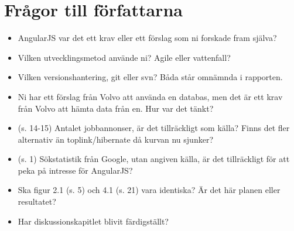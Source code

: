 \section{Frågor till författarna} %
\label{sec:fr_gor_till_f_rfattarna}

\begin{itemize}
    \item AngularJS var det ett krav eller ett förslag som ni forskade fram själva?
    \item Vilken utvecklingsmetod använde ni? Agile eller vattenfall?
    \item Vilken versionshantering, git eller svn? Båda står omnämnda i rapporten.
    \item Ni har ett förslag från Volvo att använda en databas, men det är ett krav från Volvo att hämta data från en. Hur var det tänkt?
    \item (s. 14-15) Antalet jobbannonser, är det tillräckligt som källa? Finns det fler alternativ än toplink/hibernate då kurvan nu sjunker?
    \item (s. 1) Sökstatistik från Google, utan angiven källa, är det tillräckligt för att peka på intresse för AngularJS?
    \item Ska figur 2.1 (s. 5) och 4.1 (s. 21) vara identiska?  Är det här planen eller resultatet?
    \item Har diskussionskapitlet blivit färdigställt?

\end{itemize}

